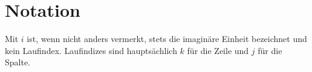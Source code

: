 \chapter{Notation}

Mit $i$ ist, wenn nicht anders vermerkt, stets die imaginäre Einheit bezeichnet
und kein Laufindex.
Laufindizes sind hauptsächlich $k$ für die Zeile und $j$ für die Spalte.
